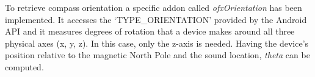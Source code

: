 \documentclass[journal]{IEEEtran}
\begin{document}

To retrieve compass orientation a specific addon called \emph{ofxOrientation} has been implemented. It accesses the `TYPE\_ORIENTATION' provided by the Android API and it measures degrees of rotation that a device makes around all three physical axes (x, y, z). In this case, only the z-axis is needed. Having the device's position relative to the magnetic North Pole and the sound location, \textit{theta} can be computed.
\end{document}

